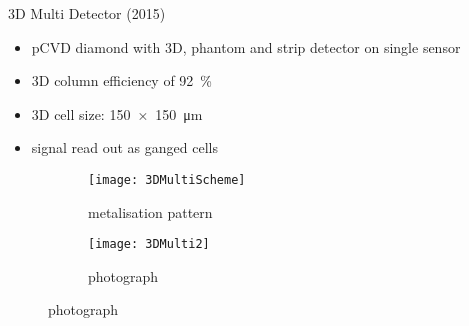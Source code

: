 % 
% 	
% 	
% 

\begin{frame}{3D Multi Detector (2015)}

	\begin{itemize}
		\itemfill
		\item pCVD diamond with 3D, phantom and strip detector on single sensor
		\item 3D column efficiency of \SI{92}{\%}
		\item 3D cell size: \SI{150x150}{\micro\meter}
		\item signal read out as ganged cells
	\end{itemize}
	
	\begin{figure}
		\centering
		\begin{subfigure}{0.45\textwidth}  
			\centering 
			\texttt{[image: 3DMultiScheme]}
			\caption{metalisation pattern}
		\end{subfigure}
		\begin{subfigure}{0.45\textwidth} 
			\centering 
			\texttt{[image: 3DMulti2]}
			\caption{photograph}
		\end{subfigure}
	\end{figure}\vspace*{-15pt}

\end{frame}

